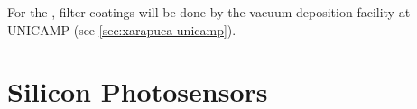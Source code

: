 
For the , filter coatings will be done by the vacuum deposition facility at UNICAMP (see \ref{sec:xarapuca-unicamp}).







\section{Silicon Photosensors}
\label{sec:fdsp-pd-ps}



